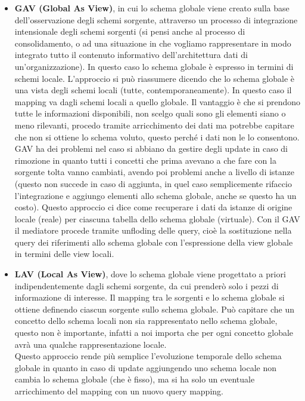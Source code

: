 \begin{itemize}
  \item \textbf{GAV (Global As View)}, in cui lo schema globale viene creato sulla base dell'osservazione degli schemi sorgente, attraverso un processo di integrazione intensionale degli schemi sorgenti (si pensi anche al processo di consolidamento, o ad una situazione in che vogliamo rappresentare in modo integrato tutto il contenuto informativo dell'architettura dati di un'organizzazione). In questo caso lo schema globale è espresso in termini di schemi locale. L'approccio si può riassumere dicendo che lo schema globale è una vista degli schemi locali (tutte, contemporaneamente). In questo caso il mapping va dagli schemi locali a quello globale. Il vantaggio è che si prendono tutte le informazioni disponibili, non scelgo quali sono gli elementi siano o meno rilevanti, procedo tramite arricchimento dei dati ma potrebbe capitare che non si ottiene lo schema voluto, questo perché i dati non le lo consentono.\\
  
  GAV ha dei problemi nel caso si abbiano da gestire degli update in caso di rimozione in quanto tutti i concetti che prima avevano a che fare con la sorgente tolta vanno cambiati, avendo poi problemi anche a livello di istanze (questo non succede in caso di aggiunta, in quel caso semplicemente rifaccio l'integrazione e aggiungo elementi allo schema globale, anche se questo ha un costo). Questo approccio ci dice come recuperare i dati da istanze di origine locale (reale) per ciascuna tabella dello schema globale (virtuale). Con il GAV il mediatore procede tramite unfloding delle query, cioè la sostituzione nella query dei riferimenti allo schema globale con l'espressione della view globale in termini delle view locali.
 
  \item \textbf{LAV (Local As View)}, dove lo schema globale viene progettato a priori indipendentemente dagli schemi sorgente, da cui prenderò solo i pezzi di informazione di interesse. Il mapping tra le sorgenti e lo schema globale si ottiene definendo ciascun sorgente sullo schema globale. Può capitare che un concetto dello schema locali non sia rappresentato nello schema globale, questo non è importante, infatti a noi importa che per ogni concetto globale avrà una qualche rappresentazione locale. \\
  
  Questo approccio rende più semplice l'evoluzione temporale dello schema globale in quanto in caso di update aggiungendo uno schema locale non cambia lo schema globale (che è fisso), ma si ha solo un eventuale arricchimento del mapping con un nuovo query mapping. \\
  

\end{itemize}
